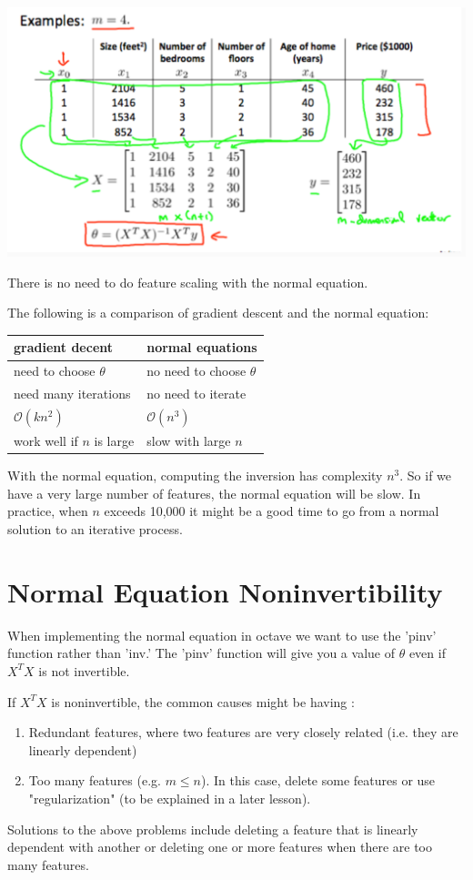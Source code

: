 \documentclass[10pt,a4paper,UTF8]{article}
\begin{document}
\begin{center}
\includegraphics[width=.9\linewidth]{../../img/computer_ng/20171007normalEquation.png}
\end{center}

There is no need to do feature scaling with the normal equation.

The following is a comparison of gradient descent and the normal equation:


\begin{center}
\begin{tabular}{ll}
\hline
gradient decent & normal equations\\
\hline
need to choose \(\theta\) & no need to choose \(\theta\)\\
need many iterations & no need to iterate\\
\(\mathcal{O}(kn^{2})\) & \(\mathcal{O}(n^3)\)\\
work well if \(n\) is large & slow with large \(n\)\\
\hline
\end{tabular}
\end{center}

With the normal equation, computing the inversion has complexity \(n^{3}\). So if we have a very large number of features, the normal equation will be slow. In practice, when \(n\) exceeds 10,000 it might be a good time to go from a normal solution to an iterative process.
\section{Normal Equation Noninvertibility}
\label{sec:org988596d}


When implementing the normal equation in octave we want to use the 'pinv' function rather than 'inv.' The 'pinv' function will give you a value of \(\theta\) even if \(X^{T}X\) is not invertible.

If \(X^{T}X\) is noninvertible, the common causes might be having :

\begin{enumerate}
\item Redundant features, where two features are very closely related (i.e. they are linearly dependent)

\item Too many features (e.g. \(m\leq n\)). In this case, delete some features or use "regularization" (to be explained in a later lesson).
\end{enumerate}

Solutions to the above problems include deleting a feature that is linearly dependent with another or deleting one or more features when there are too many features.
\end{document}
